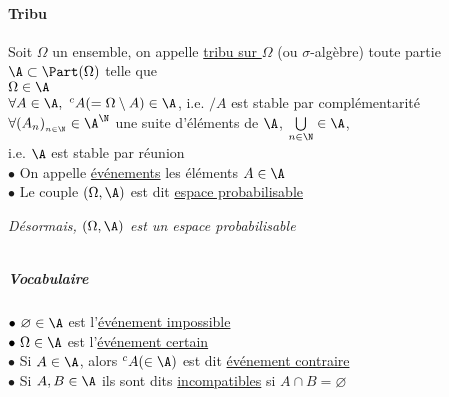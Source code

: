 		\paragraph{Tribu}
			Soit $\Omega$ un ensemble, on appelle \uline{tribu sur $\Omega$} (ou $\sigma$-algèbre) toute partie $\A\subset\Part(\Omega)$ telle que \\
			\hspace*{2.5cm} \un $\Omega \in \A$ \\ \hspace*{2.5cm} \deux $\forall A\in \A,~^cA (=\Omega\setminus A) \in \A$, i.e. $/A$ est stable par complémentarité\\
			\hspace*{2.5cm} \trois $\forall (A_n)_{_{n\in\N}}\in \A^\N$ une suite d'éléments de $\A$, $\bigcup\limits_{n\in\N} \in\A$, \\
			i.e. $\A$ est stable par réunion  \trait
		\vspace*{-1cm} \\ $\bullet$ On appelle \uline{événements} les éléments $A\in\A $ \vspace*{0.2cm} \\
		$\bullet $ Le couple $(\Omega ,\A)$ est dit \uline{espace probabilisable}\\
		\begin{center}
		\textit{Désormais, $(\Omega,\A)$ est un espace probabilisable}
		\end{center}
		${}$ \\ 
		\subparagraph{Vocabulaire} ${}$ \\
		\hspace*{2.5cm} $\bullet ~ \varnothing \in\A$ est l'\uline{événement impossible} \\
		\hspace*{2.5cm} $\bullet ~ \Omega \in\A$ est l'\uline{événement certain} \\
		\hspace*{2.5cm} $\bullet$ Si $A\in\A$, alors $^cA (\in\A)$ est dit \uline{événement contraire}\\
		\hspace*{2.5cm} $\bullet$ Si $A,B\in\A$ ils sont dits \uline{incompatibles} si $A\cap B = \varnothing$
